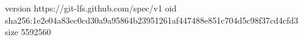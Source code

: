 version https://git-lfs.github.com/spec/v1
oid sha256:1e2e04a83ec0cd30a9a95864b23951261af447488e851c704d5c98f37cd4cfd3
size 5592560

